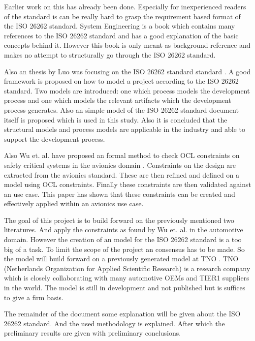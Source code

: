 \documentclass[a4paper]{article}
\newcommand{\ISO}{ISO 26262 standard\xspace}
\begin{document}
Earlier work on this has already been done.
Especially for inexperienced readers of the standard is can be really hard to grasp the requirement based format of the \ISO.
System Engineering \cite{Ross2016a} is a book which contains many references to the \ISO and has a good explanation of the basic concepts behind it.
However this book is only meant as background reference and makes no attempt to structurally go through the \ISO.

Also an thesis by Luo was focusing on the \ISO standard \cite{thesis.luna}.
A good framework is proposed on how to model a project according to the \ISO.
Two models are introduced: one which process models the development process and one which models the relevant artifacts which the development process generates.
Also an simple model of the \ISO document itself is proposed which is used in this study.
Also it is concluded that the structural models and process models are applicable in the industry and able to support the development process.

Also Wu et. al. have proposed an formal method to check OCL constraints on safety critical systems in the avionics domain \cite{Wu2015}.
Constraints on the design are extracted from the avionics standard.
These are then refined and defined on a model using OCL constraints.
Finally these constraints are then validated against an use case.
This paper has shown that these constraints can be created and effectively applied within an avionics use case.

%
%
The goal of this project is to build forward on the previously mentioned two literatures.
And apply the constraints as found by Wu et. al. in the automotive domain.
However the creation of an model for the \ISO is a too big of a task.
To limit the scope of the project an consensus has to be made.
So the model will build forward on a previously generated model at TNO \cite{KhabbazSaberi2017}.
TNO (Netherlands Organization for Applied Scientific Research) is a research company which is closely collaborating with many automotive OEMs and TIER1 suppliers in the world.
The model is still in development and not published but is suffices to give a firm basis.

The remainder of the document some explanation will be given about the \ISO. And the used methodology is explained.
After which the preliminary results are given with preliminary conclusions.
\end{document}
